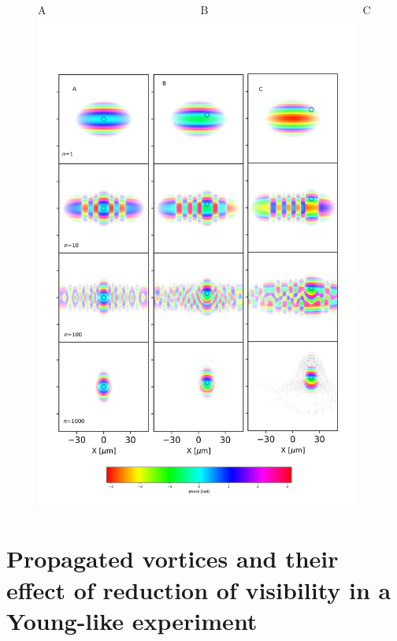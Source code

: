 \documentclass[a4paper,10pt]{article}
\begin{document}
\begin{figure}
A~~~~~~~~~~~~~~~~~~~~~~~~~~~~B~~~~~~~~~~~~~~~~~~~~~~~~~~~~C\\
\includegraphics[width=0.95\textwidth]{Figures/vx_id16a_ABC.png}
\end{figure}
 
 
 
 
 
 
 
 \section{Propagated vortices and their effect of reduction of visibility in a Young-like experiment}
 
 
 
 
 
 
 
 
 
 
 
 
 
 
 
 
 
 
 
 


\end{document}
